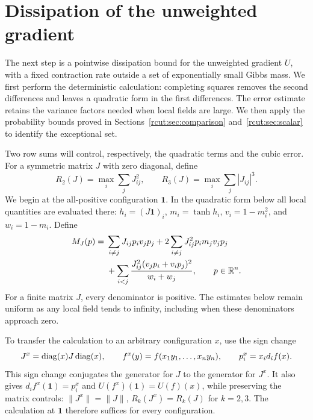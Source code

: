 \section{Dissipation of the unweighted gradient}
\label{rcut:sec:gradient}

The next step is a pointwise dissipation bound for the unweighted
gradient $U$, with a fixed contraction rate outside a set of exponentially
small Gibbs mass.  We first perform the deterministic calculation: completing
squares removes the second differences and leaves a quadratic form in the
first differences.  The error estimate retains the variance factors needed
when local fields are large.  We then apply the probability bounds proved in
Sections~\ref{rcut:sec:comparison} and~\ref{rcut:sec:scalar} to identify
the exceptional set.

Two row sums will control, respectively, the quadratic terms and the
cubic error.  For a symmetric matrix $J$ with zero diagonal, define
\[
 R_2(J)=\max_i\sum_j J_{ij}^2,
 \qquad
 R_3(J)=\max_i\sum_j |J_{ij}|^3.
\]
We begin at the all-positive configuration $\mathbf 1$.  In the quadratic
form below all local quantities are evaluated there:
$h_i=(J\mathbf 1)_i$, $m_i=\tanh h_i$,
$v_i=1-m_i^2$, and $w_i=1-m_i$.  Define
\begin{equation}
\begin{split}
 M_J(p)={}&\sum_{i\ne j}J_{ij}p_i v_jp_j
       +2\sum_{i\ne j}J_{ij}^2p_i m_jv_jp_j\\
       &+\sum_{i<j}
          \frac{J_{ij}^2(v_jp_i+v_ip_j)^2}{w_i+w_j},
       \qquad p\in\mathbb R^n.
\end{split}
\label{rcut:eq:gradient-form}
\end{equation}
For a finite matrix $J$, every denominator is positive.  The estimates
below remain uniform as any local field tends to infinity, including
when these denominators approach zero.

To transfer the calculation to an arbitrary configuration $x$, use
the sign change
\[
 J^x=\operatorname{diag}(x)J\operatorname{diag}(x),\qquad
 f^x(y)=f(x_1y_1,\ldots,x_ny_n),\qquad
 p_i^x=x_i d_i f(x).
\]
This sign change conjugates the generator for $J$ to the generator for
$J^x$.  It also gives $d_i f^x(\mathbf 1)=p_i^x$ and
$U(f^x)(\mathbf 1)=U(f)(x)$, while preserving the matrix controls:
$\|J^x\|=\|J\|$, $R_k(J^x)=R_k(J)$ for $k=2,3$.
The calculation at $\mathbf 1$ therefore suffices for every configuration.


